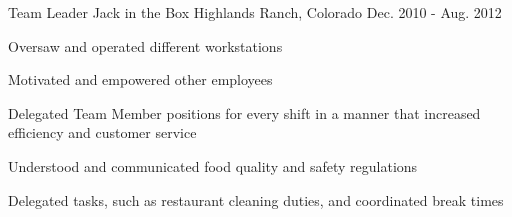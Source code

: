 \begin{cventries}

\cventry
{Team Leader} %
{Jack in the Box} %
{Highlands Ranch, Colorado} %
{Dec. 2010 - Aug. 2012} %
{ %
\begin{cvitems}
\item {Oversaw and operated different workstations}
\item {Motivated and empowered other employees}
\item {Delegated Team Member positions for every shift in a manner that increased efficiency and customer service}
\item {Understood and communicated food quality and safety regulations}
\item {Delegated tasks, such as restaurant cleaning duties, and coordinated break times}
\end{cvitems} 
}



\end{cventries}